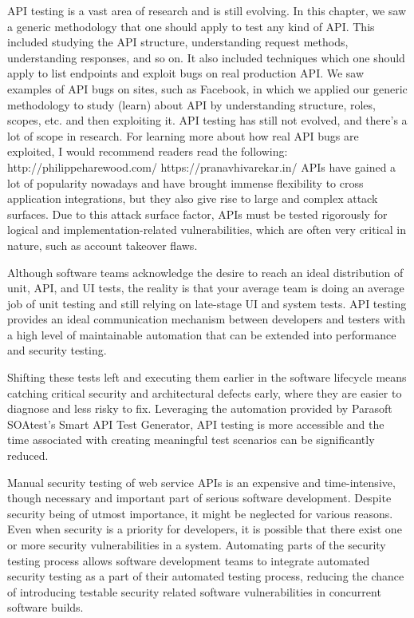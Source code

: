 
API testing is a vast area of research and is still evolving. In this chapter, we saw a
generic methodology that one should apply to test any kind of API. This included
studying the API structure, understanding request methods, understanding
responses, and so on. It also included techniques which one should apply to list
endpoints and exploit bugs on real production API. We saw examples of API bugs
on sites, such as Facebook, in which we applied our generic methodology to study
(learn) about API by understanding structure, roles, scopes, etc. and then exploiting
it. API testing has still not evolved, and there's a lot of scope in research.
For learning more about how real API bugs are exploited, I would recommend
readers read the following:
http://philippeharewood.com/
https://pranavhivarekar.in/
APIs have gained a lot of popularity nowadays and have brought immense flexibility
to cross application integrations, but they also give rise to large and complex attack
surfaces. Due to this attack surface factor, APIs must be tested rigorously for logical
and implementation-related vulnerabilities, which are often very critical in nature,
such as account takeover flaws.


Although software teams acknowledge the desire to reach an ideal distribution of unit, API, and UI tests, the reality is that your average team is doing an average job of unit testing and still relying on late-stage UI and system tests. API testing provides an ideal communication mechanism between developers and testers with a high level of maintainable automation that can be extended into performance and security testing.

Shifting these tests left and executing them earlier in the software lifecycle means catching critical security and architectural defects early, where they are easier to diagnose and less risky to fix. Leveraging the automation provided by Parasoft SOAtest's Smart API Test Generator, API testing is more accessible and the time associated with creating meaningful test scenarios can be significantly reduced.



Manual security testing of web service APIs is an expensive and time-intensive, though
necessary and important part of serious software development. Despite security being of
utmost importance, it might be neglected for various reasons. Even when security is a
priority for developers, it is possible that there exist one or more security vulnerabilities
in a system. Automating parts of the security testing process allows software development
teams to integrate automated security testing as a part of their automated testing process,
reducing the chance of introducing testable security related software vulnerabilities in concurrent software builds.



